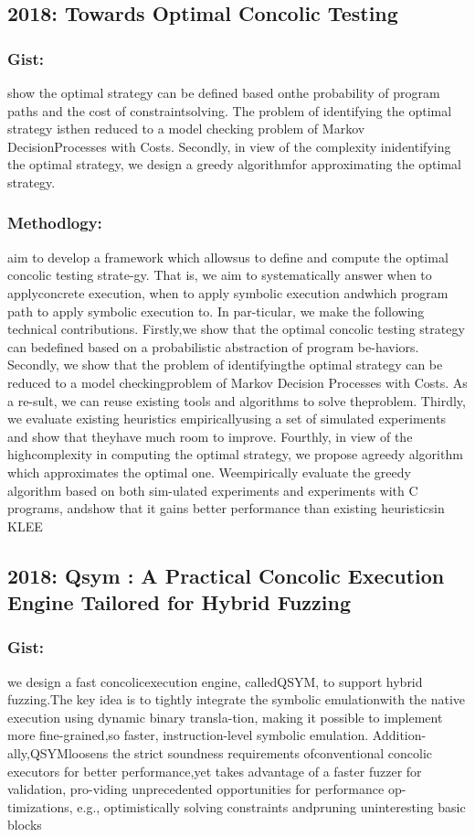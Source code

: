 \documentclass[	runningheads,
				a4paper]{llncs}
\begin{document}
\subsection{2018: Towards Optimal Concolic Testing}
\subsubsection{Gist:}
show the optimal strategy can be defined based onthe probability of program paths and the cost of constraintsolving. The problem of identifying the optimal strategy isthen reduced to a model checking problem of Markov DecisionProcesses with Costs. Secondly, in view of the complexity inidentifying the optimal strategy, we design a greedy algorithmfor approximating the optimal strategy.

\subsubsection{Methodlogy:}
aim to develop a framework which allowsus to define and compute the optimal concolic testing strate-gy. That is, we aim to systematically answer when to applyconcrete execution, when to apply symbolic execution andwhich program path to apply symbolic execution to. In par-ticular, we make the following technical contributions. Firstly,we show that the optimal concolic testing strategy can bedefined based on a probabilistic abstraction of program be-haviors. Secondly, we show that the problem of identifyingthe optimal strategy can be reduced to a model checkingproblem of Markov Decision Processes with Costs. As a re-sult, we can reuse existing tools and algorithms to solve theproblem. Thirdly, we evaluate existing heuristics empiricallyusing a set of simulated experiments and show that theyhave much room to improve. Fourthly, in view of the highcomplexity in computing the optimal strategy, we propose agreedy algorithm which approximates the optimal one. Weempirically evaluate the greedy algorithm based on both sim-ulated experiments and experiments with C programs, andshow that it gains better performance than existing heuristicsin KLEE 

\subsection{2018: Qsym : A Practical Concolic Execution Engine Tailored for Hybrid Fuzzing}
\subsubsection{Gist:}
we design a fast concolicexecution engine, calledQSYM, to support hybrid fuzzing.The key idea is to tightly integrate the symbolic emulationwith the native execution using dynamic binary transla-tion, making it possible to implement more fine-grained,so faster, instruction-level symbolic emulation. Addition-ally,QSYMloosens the strict soundness requirements ofconventional concolic executors for better performance,yet takes advantage of a faster fuzzer for validation, pro-viding unprecedented opportunities for performance op-timizations, e.g., optimistically solving constraints andpruning uninteresting basic blocks
\end{document}
